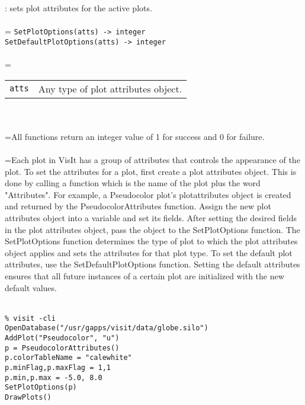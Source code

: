 \documentclass[10pt,a4paper]{report}
\begin{document}
{}
: sets plot attributes for the active plots.\\[-3mm]

 \\ 
\hangindent=\parindent 
\verb!SetPlotOptions(atts) -> integer!\\ 
\verb!SetDefaultPlotOptions(atts) -> integer!\\ [-3mm]

 \\ 
\hangindent=\parindent 
\begin{tabular}{ll}
\verb!atts! & Any type of plot attributes object. \\
\end{tabular} \\[-2mm]


 \\ 
\hangindent=\parindent All functions return an integer value of 1 for success and 0 for failure. \\[-3mm] 

 \\ 
\hangindent=\parindent Each plot in VisIt has a group of attributes that controls the appearance of the plot. To set the attributes for a plot, first create a plot attributes object. This is done by calling a function which is the name of the plot plus the word "Attributes". For example, a Pseudocolor plot's plotattributes object is created and returned by the PseudocolorAttributes function. Assign the new plot attributes object into a variable and set its fields. After setting the desired fields in the plot attributes object, pass the object to the SetPlotOptions function. The SetPlotOptions function determines the type of plot to which the plot attributes object applies and sets the attributes for that plot type. To set the default plot attributes, use the SetDefaultPlotOptions function. Setting the default attributes ensures that all future instances of a certain plot are initialized with the new default values. \\[-3mm] 

\\[-6mm]
\begin{verbatim}% visit -cli
OpenDatabase("/usr/gapps/visit/data/globe.silo")
AddPlot("Pseudocolor", "u")
p = PseudocolorAttributes()
p.colorTableName = "calewhite"
p.minFlag,p.maxFlag = 1,1
p.min,p.max = -5.0, 8.0
SetPlotOptions(p)
DrawPlots()
\end{verbatim}
\newpage
\end{document}
